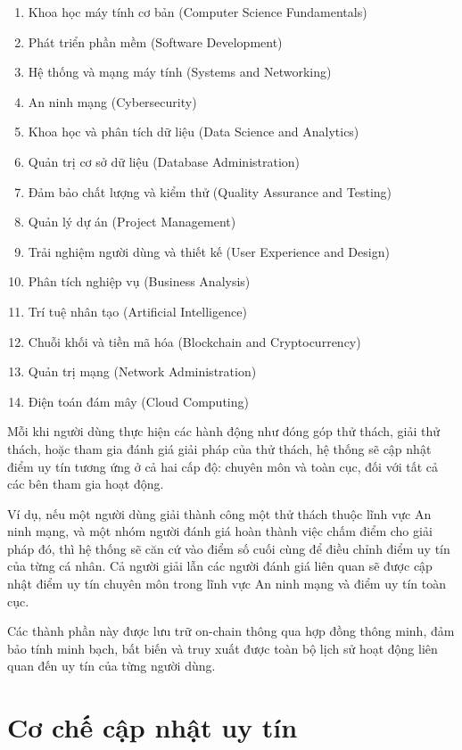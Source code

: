 \begin{enumerate}
  \item Khoa học máy tính cơ bản (Computer Science Fundamentals)
  \item Phát triển phần mềm (Software Development)
  \item Hệ thống và mạng máy tính (Systems and Networking)
  \item An ninh mạng (Cybersecurity)
  \item Khoa học và phân tích dữ liệu (Data Science and Analytics)
  \item Quản trị cơ sở dữ liệu (Database Administration)
  \item Đảm bảo chất lượng và kiểm thử (Quality Assurance and Testing)
  \item Quản lý dự án (Project Management)
  \item Trải nghiệm người dùng và thiết kế (User Experience and Design)
  \item Phân tích nghiệp vụ (Business Analysis)
  \item Trí tuệ nhân tạo (Artificial Intelligence)
  \item Chuỗi khối và tiền mã hóa (Blockchain and Cryptocurrency)
  \item Quản trị mạng (Network Administration)
  \item Điện toán đám mây (Cloud Computing)
\end{enumerate}

Mỗi khi người dùng thực hiện các hành động như đóng góp thử thách, giải thử thách, hoặc tham gia đánh giá giải pháp của thử thách, hệ thống sẽ cập nhật điểm uy tín tương ứng ở cả hai cấp độ: chuyên môn và toàn cục, đối với tất cả các bên tham gia hoạt động.

Ví dụ, nếu một người dùng giải thành công một thử thách thuộc lĩnh vực An ninh mạng, và một nhóm người đánh giá hoàn thành việc chấm điểm cho giải pháp đó, thì hệ thống sẽ căn cứ vào điểm số cuối cùng để điều chỉnh điểm uy tín của từng cá nhân.
Cả người giải lẫn các người đánh giá liên quan sẽ được cập nhật điểm uy tín chuyên môn trong lĩnh vực An ninh mạng và điểm uy tín toàn cục.

Các thành phần này được lưu trữ on-chain thông qua hợp đồng thông minh, đảm bảo tính minh bạch, bất biến và truy xuất được toàn bộ lịch sử hoạt động liên quan đến uy tín của từng người dùng.

\section{Cơ chế cập nhật uy tín}

